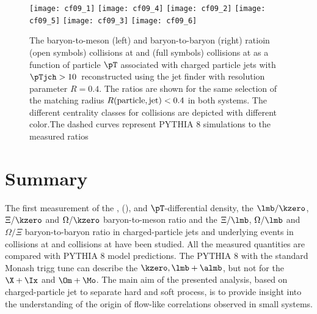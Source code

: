 \documentclass[ALICE,manyauthors]{cernphprep}
\begin{document}
\begin{figure}[!ht]
	\begin{center}
		\texttt{[image: cf09\_1]}
		\texttt{[image: cf09\_4]}
		\texttt{[image: cf09\_2]}
		\texttt{[image: cf09\_5]}
		\texttt{[image: cf09\_3]}
		\texttt{[image: cf09\_6]}
	\end{center}
	\caption{The baryon-to-meson (left) and baryon-to-baryon (right) ratioin \pp (open symbols) collisions at \thirteen and \pPb (full symbols) collisions at \fivenn as a function of particle $\pT$ associated with charged particle jets with $\pTjch > 10$~\GeVc reconstructed using the \akT jet finder with resolution parameter $R = 0.4$. The ratios are shown for the same selection of the matching radius $R(\rm{particle, jet}) < 0.4$ in both systems. The different centrality classes for \pPb collisions are depicted with different color.The dashed curves represent PYTHIA 8 simulations to the measured ratios }
	\label{fig:pppPbRatio}
\end{figure}






\clearpage
\section{Summary}%
\label{sec:Summary}

The first measurement of the \kzero, \lmb (\almb), \Xis and \Oms $\pT$-differential density, the $\lmb/\kzero$, $\Xi/\kzero$ and $\Omega/\kzero$ baryon-to-meson ratio and the $\Xi/\lmb$, $\Omega/\lmb$ and $\Omega/\Xi$ baryon-to-baryon ratio in charged-particle jets and underlying events in \pp collisions at \thirteen and \pPb collisions at \fivenn have been studied.
All the measured quantities are compared with PYTHIA 8 model predictions.
The PYTHIA 8 with the standard Monash trigg tune can describe the $\kzero, \lmb + \almb$, but not for the $\X + \Ix$ and $\Om + \Mo$.
The main aim of the presented analysis, based on charged-particle jet to separate hard and soft process, is to provide insight into the understanding of the origin of flow-like correlations observed in small systems.
\end{document}
